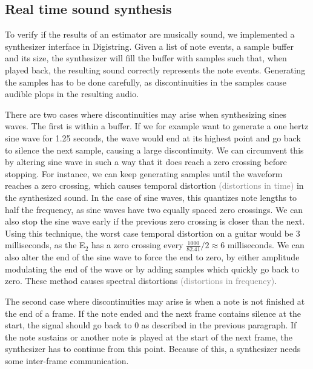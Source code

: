\documentclass[10pt,twocolumn]{article}
\newcommand{\note}[2]{#1${}_{#2}$}
\begin{document}
\subsection{Real time sound synthesis}
To verify if the results of an estimator are musically sound, we implemented a synthesizer interface in Digistring. Given a list of note events, a sample buffer and its size, the synthesizer will fill the buffer with samples such that, when played back, the resulting sound correctly represents the note events. Generating the samples has to be done carefully, as discontinuities in the samples cause audible plops in the resulting audio.%

There are two cases where discontinuities may arise when synthesizing sines waves. The first is within a buffer. If we for example want to generate a one hertz sine wave for 1.25 seconds, the wave would end at its highest point and go back to silence the next sample, causing a large discontinuity. We can circumvent this by altering sine wave in such a way that it does reach a zero crossing before stopping. For instance, we can keep generating samples until the waveform reaches a zero crossing, which causes temporal distortion \textcolor{gray}{(distortions in time)} in the synthesized sound. In the case of sine waves, this quantizes note lengths to half the frequency, as sine waves have two equally spaced zero crossings. We can also stop the sine wave early if the previous zero crossing is closer than the next. Using this technique, the worst case temporal distortion on a guitar would be 3 milliseconds, as the \note{E}{2} has a zero crossing every $ \frac{1000}{82.41} / 2 \approx 6 $ milliseconds. We can also alter the end of the sine wave to force the end to zero, by either amplitude modulating the end of the wave or by adding samples which quickly go back to zero. These method causes spectral distortions \textcolor{gray}{(distortions in frequency)}.

The second case where discontinuities may arise is when a note is not finished at the end of a frame. If the note ended and the next frame contains silence at the start, the signal should go back to 0 as described in the previous paragraph. If the note sustains or another note is played at the start of the next frame, the synthesizer has to continue from this point. Because of this, a synthesizer needs some inter-frame communication.
\end{document}
